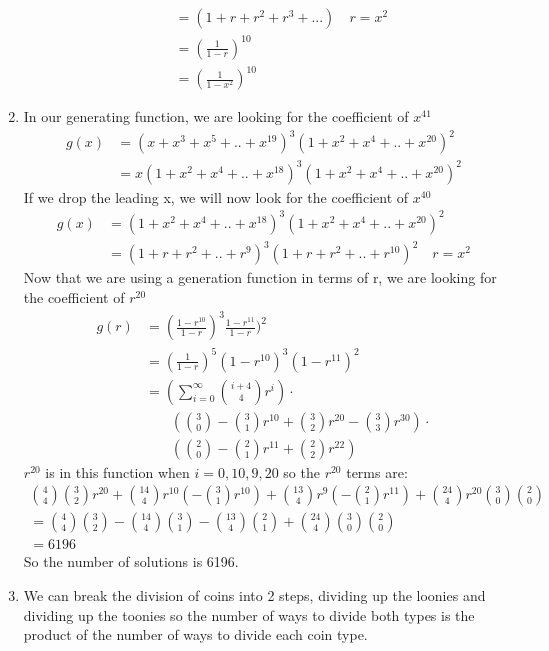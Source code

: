 \documentclass[11pt]{article}
\begin{document}
\begin{enumerate}[]
\begin{enumerate}
\begin{align}
		&= (1+r+r^2+r^3+...) \quad r=x^2 \nonumber\\
		&= (\frac{1}{1-r})^{10} \nonumber\\
		&= (\frac{1}{1-x^2})^{10} \nonumber
	\end{align}
	\end{enumerate}
\item
In our generating function, we are looking for the coefficient of $x^{41}$
\begin{align}
	g(x) &= (x+x^3+x^5+..+x^{19})^3(1+x^2+x^4+..+x^{20})^2 \nonumber\\
	&= x(1+x^2+x^4+..+x^{18})^3(1+x^2+x^4+..+x^{20})^2 \nonumber
\end{align}
If we drop the leading x, we will now look for the coefficient of $x^{40}$
\begin{align}
	g(x) &= (1+x^2+x^4+..+x^{18})^3(1+x^2+x^4+..+x^{20})^2 \nonumber\\
	&= (1+r+r^2+..+r^{9})^3(1+r+r^2+..+r^{10})^2 \quad r=x^2 \nonumber
\end{align}
Now that we are using a generation function in terms of r, we are looking for the coefficient of $r^{20}$
\begin{align}
	g(r) &= (\frac{1-r^{10}}{1-r})^3\frac{1-r^{11}}{1-r})^2 \nonumber\\
	&= (\frac{1}{1-r})^5(1-r^{10})^3(1-r^{11})^2 \nonumber\\
	&= (\sum_{i=0}^\infty\binom{i+4}{4}r^i)\cdot\nonumber\\ 
		&\phantom{{}=1}(\binom{3}{0}-\binom{3}{1}r^{10}+\binom{3}{2}r^{20}-\binom{3}{3}r^{30})\cdot\nonumber\\
		&\phantom{{}=1}(\binom{2}{0}-\binom{2}{1}r^{11}+\binom{2}{2}r^{22})\nonumber
\end{align}
$r^20$ is in this function when $i=0,10,9,20$ so the $r^20$ terms are:
\begin{gather}
	\binom{4}{4}\binom{3}{2}r^{20} + \binom{14}{4}r^{10}(-\binom{3}{1}r^10) +\binom{13}{4}r^9(-\binom{2}{1}r^{11}) + \binom{24}{4}r^{20}\binom{3}{0}\binom{2}{0} \nonumber\\
	= \binom{4}{4}\binom{3}{2} - \binom{14}{4}\binom{3}{1} - \binom{13}{4}\binom{2}{1} + \binom{24}{4}\binom{3}{0}\binom{2}{0} \nonumber\\
	= 6196 \nonumber
\end{gather}
So the number of solutions is 6196.
\item We can break the division of coins into 2 steps, dividing up the loonies and dividing up the toonies so the number of ways to divide both types is the product of the number of ways to divide each coin type.

\end{enumerate}
\end{document}

